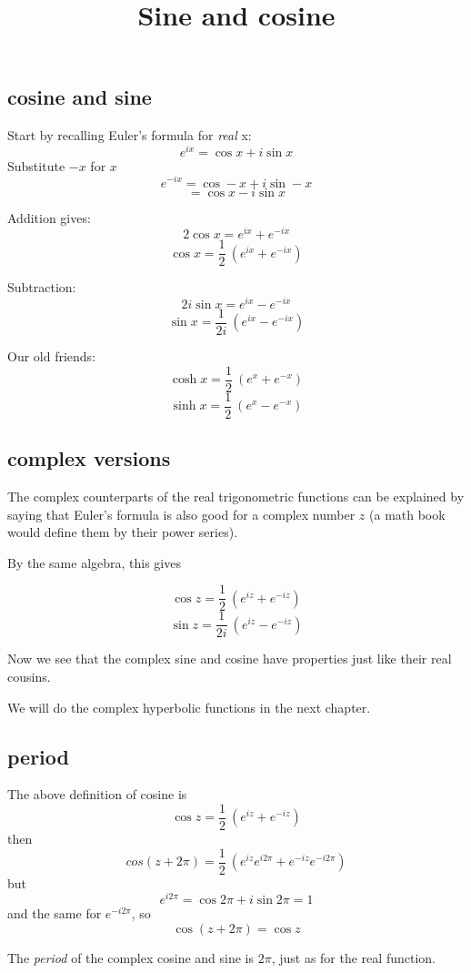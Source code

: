 \documentclass[11pt, oneside]{article}
\title{Sine and cosine}
\date{}
\begin{document}
\maketitle
\Large

\subsection*{cosine and sine}

Start by recalling Euler's formula for \emph{real} x:
\[ e^{ix} = \cos x + i \sin x \]
Substitute $-x$ for $x$
\[ e^{-ix} = \cos -x + i \sin -x \]
\[ = \cos x - i \sin x \]

Addition gives:
\[ 2 \cos x = e^{ix} + e^{-ix} \]
\[ \cos x = \frac{1}{2} \ (e^{ix} + e^{-ix}) \]

Subtraction:
\[ 2i \sin x = e^{ix} - e^{-ix} \]
\[ \sin x = \frac{1}{2i} \ (e^{ix} - e^{-ix}) \]

Our old friends:
\[ \cosh x =  \frac{1}{2} \ (e^{x}+ e^{-x}) \]
\[ \sinh x =  \frac{1}{2} \ (e^{x} - e^{-x}) \]

\subsection*{complex versions}

The complex counterparts of the real trigonometric functions can be explained by saying that Euler's formula is also good for a complex number $z$ (a math book would define them by their power series).  

By the same algebra, this gives

\[ \cos z = \frac{1}{2} \ (e^{iz} + e^{-iz}) \]
\[ \sin z = \frac{1}{2i} \ (e^{iz} - e^{-iz}) \]

Now we see that the complex sine and cosine have properties just like their real cousins.

We will do the complex hyperbolic functions in the next chapter.

\subsection*{period}

The above definition of cosine is
\[ \cos z = \frac{1}{2} \ (e^{iz} + e^{-iz}) \]
then
\[ cos (z + 2 \pi) = \frac{1}{2} \ (e^{iz} e^{i2 \pi} + e^{-iz} e^{-i 2\pi}) \]
but
\[ e^{i 2 \pi} = \cos 2 \pi + i \sin 2 \pi = 1 \]
and the same for $e^{-i 2 \pi}$, so
\[ \cos (z + 2\pi) = \cos z \]

The \emph{period} of the complex cosine and sine is $2 \pi$, just as for the real function.
\end{document}
